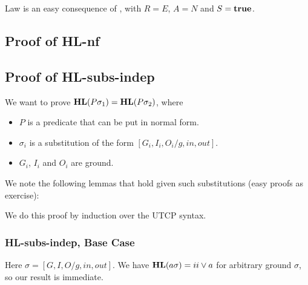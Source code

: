 Law  is an easy consequence of ,
with $R=E$, $A=N$ and $S=\mathbf{true}$.

\newpage
\subsection{Proof of \textsf{HL-nf}}



\newpage
\subsection{Proof of \textsf{HL-subs-indep}}

We want to prove $\mathbf{HL}(P\sigma_1)=\mathbf{HL}(P\sigma_2)$, where
\begin{itemize}
  \item $P$ is a predicate that can be put in normal form.
  \item $\sigma_i$ is a substitution of the form $[G_i,I_i,O_i/g,in,out]$.
  \item $G_i$, $I_i$ and $O_i$ are ground.
\end{itemize}
We note the following lemmas that hold given such substitutions
(easy proofs as exercise):

We do this proof by induction over the UTCP syntax.

\subsubsection{\textsf{HL-subs-indep}, Base Case}

Here $\sigma=[G,I,O/g,in,out]$.
We have $\mathbf{HL}(a\sigma) = ii \lor a$ for arbitrary ground $\sigma$,
so our result is immediate.

